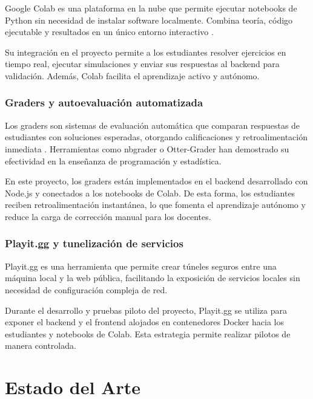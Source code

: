 \documentclass[letter,oneside,12pt,spanish]{report}
\begin{document}
Google Colab es una plataforma en la nube que permite ejecutar notebooks de Python sin necesidad de instalar software localmente. Combina teoría, código ejecutable y resultados en un único entorno interactivo \parencite{bisong2019}.

Su integración en el proyecto permite a los estudiantes resolver ejercicios en tiempo real, ejecutar simulaciones y enviar sus respuestas al backend para validación. Además, Colab facilita el aprendizaje activo y autónomo.

\subsection{Graders y autoevaluación automatizada}

Los graders son sistemas de evaluación automática que comparan respuestas de estudiantes con soluciones esperadas, otorgando calificaciones y retroalimentación inmediata \parencite{kurnia2001}. Herramientas como nbgrader o Otter-Grader han demostrado su efectividad en la enseñanza de programación y estadística.

En este proyecto, los graders están implementados en el backend desarrollado con Node.js y conectados a los notebooks de Colab. De esta forma, los estudiantes reciben retroalimentación instantánea, lo que fomenta el aprendizaje autónomo y reduce la carga de corrección manual para los docentes.

\subsection{Playit.gg y tunelización de servicios}

Playit.gg es una herramienta que permite crear túneles seguros entre una máquina local y la web pública, facilitando la exposición de servicios locales sin necesidad de configuración compleja de red.

Durante el desarrollo y pruebas piloto del proyecto, Playit.gg se utiliza para exponer el backend y el frontend alojados en contenedores Docker hacia los estudiantes y notebooks de Colab. Esta estrategia permite realizar pilotos de manera controlada.


\newpage


\chapter{Estado del Arte}
\end{document}
